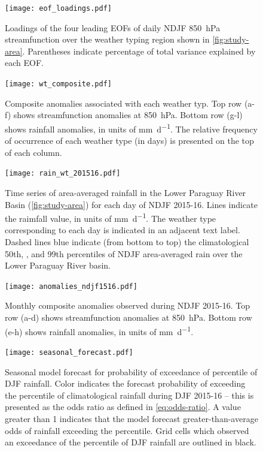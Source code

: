 \documentclass{ametsoc}
\begin{document}
\begin{figure}
	\noindent\texttt{[image: eof\_loadings.pdf]}
	\caption{
		Loadings of the four leading EOFs of daily NDJF \SI{850}{\hecto\pascal} streamfunction over the weather typing region shown in \cref{fig:study-area}.
		Parentheses indicate percentage of total variance explained by each EOF.
	}\label{fig:eof-loading}
\end{figure}

\begin{figure}
	\noindent\texttt{[image: wt\_composite.pdf]}
	\caption{
		Composite anomalies associated with each weather typ.
		Top row (a-f) shows streamfunction anomalies at \SIlist{850}{\hecto\pascal}.
		Bottom row (g-l) shows rainfall anomalies, in units of \si{\milli\meter\per\day}. 
		The relative frequency of occurrence of each weather type (in days) is presented on the top of each column.
	}
	\label{fig:wt-composite}
\end{figure}

\begin{figure}
	\noindent\texttt{[image: rain\_wt\_201516.pdf]}
	\caption{
		Time series of area-averaged rainfall in the Lower Paraguay River Basin (\cref{fig:study-area}) for each day of NDJF  2015-16.
		Lines indicate the raimfall value, in units of \si{\milli\meter\per\day}.
        The weather type corresponding to each day is indicated in an adjacent text label.
		Dashed lines blue indicate (from bottom to top) the climatological 50th, , and 99th percentiles of NDJF area-averaged rain over the Lower Paraguay River basin.
	}\label{fig:rain-wt}
\end{figure}

\begin{figure}
	\noindent\texttt{[image: anomalies\_ndjf1516.pdf]}
	\caption{
		Monthly composite anomalies observed during NDJF 2015-16.
		Top row (a-d) shows streamfunction anomalies at \SI{850}{\hecto\pascal}.
		Bottom row (e-h) shows rainfall anomalies, in units of \si{\milli\meter\per\day}.
	}\label{fig:anomalies}
\end{figure}

\begin{figure}
	\noindent\texttt{[image: seasonal\_forecast.pdf]}
	\caption{
		Seasonal model forecast for probability of exceedance of  percentile of DJF rainfall.
		Color indicates the forecast probability of exceeding the  percentile of climatological rainfall during DJF 2015-16 -- this is presented as the odds ratio as defined in \cref{eq:odds-ratio}.
		A value greater than 1 indicates that the model forecast greater-than-average odds of rainfall exceeding the  percentile.
		Grid cells which observed an exceedance of the  percentile of DJF rainfall are outlined in black.
	}\label{fig:seas-prob-fcst}
\end{figure}
\end{document}
